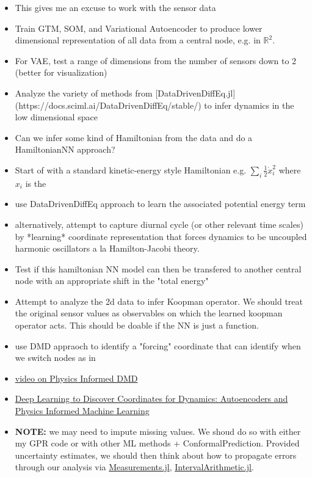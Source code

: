 \begin{itemize}
\item This gives me an excuse to work with the sensor data
\item Train GTM, SOM, and Variational Autoencoder to produce lower dimensional representation of all data from a central node, e.g. in $\mathbb{R}^2$.
\item For VAE, test a range of dimensions from the number of sensors down to 2 (better for visualization)
\item Analyze the variety of methods from [DataDrivenDiffEq.jl](https://docs.sciml.ai/DataDrivenDiffEq/stable/) to infer dynamics in the low dimensional space
\item Can we infer some kind of Hamiltonian from the data and do a HamiltonianNN approach?
\item Start of with a standard kinetic-energy style Hamiltonian e.g. $\sum_i \frac{1}{2} \dot{x}_i^2$ where $x_i$ is the
\item use DataDrivenDiffEq approach to learn the associated potential energy term
\item alternatively, attempt to capture diurnal cycle (or other relevant time scales) by *learning* coordinate representation that forces dynamics to be uncoupled harmonic oscillators a la Hamilton-Jacobi theory.
\item Test if this hamiltonian NN model can then be transfered to another central node with an appropriate shift in the "total energy"
\item Attempt to analyze the 2d data to infer Koopman operator. We should treat the original sensor values as observables on which the learned koopman operator acts. This should be doable if the NN is just a function.
\item use DMD appraoch to identify a "forcing" coordinate that can identify when we switch nodes as in \cite{brunton-havok}
\item \href{https://www.youtube.com/watch?v=lx-msllg1kU&ab_channel=SteveBrunton}{video on Physics Informed DMD}
\item \href{https://www.youtube.com/watch?v=KmQkDgu-Qp0&list=PLMrJAkhIeNNQ0BaKuBKY43k4xMo6NSbBa&ab_channel=SteveBrunton}{Deep Learning to Discover Coordinates for Dynamics: Autoencoders and Physics Informed Machine Learning}
\item \textbf{NOTE:} we may need to impute missing values. We shoud do so with either my GPR code or with other ML methods + ConformalPrediction. Provided uncertainty estimates, we should then think about how to propagate errors through our analysis via \href{https://github.com/JuliaPhysics/Measurements.jl}{Measurements.jl}, \href{https://juliaintervals.github.io/pages/packages/intervalarithmetic/}{IntervalArithmetic.jl}.
\end{itemize}
